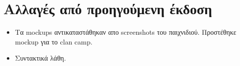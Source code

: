 \section*{Αλλαγές από προηγούμενη έκδοση}


\begin{itemize}

\item Τα mockups αντικαταστάθηκαν απο screenshots του παιχνιδιού. Προστέθηκε mockup για το clan camp.

\item Συντακτικά λάθη.

\end{itemize}

\clearpage